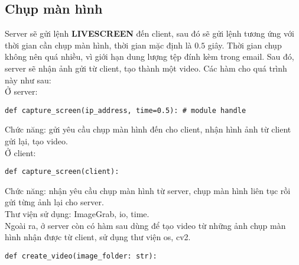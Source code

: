 \subsection{Chụp màn hình}
Server sẽ gửi lệnh \textbf{LIVESCREEN} đến client, sau đó sẽ gửi lệnh tương ứng với thời gian cần chụp màn hình, thời gian mặc định là $0.5$ giây. Thời gian chụp không nên quá nhiều, vì giới hạn dung lượng tệp đính kèm trong email. Sau đó, server sẽ nhận ảnh gửi từ client, tạo thành một video.
Các hàm cho quá trình này như sau:\\
Ở server:
\begin{lstlisting}
def capture_screen(ip_address, time=0.5): # module handle
\end{lstlisting}
Chức năng: gửi yêu cầu chụp màn hình đến cho client, nhận hình ảnh từ client gửi lại, tạo video.\\
Ở client:
\begin{lstlisting}
def capture_screen(client):
\end{lstlisting}
Chức năng: nhận yêu cầu chụp màn hình từ server, chụp màn hình liên tục rồi gửi từng ảnh lại cho server.\\
Thư viện sử dụng: ImageGrab, io, time.\\
Ngoài ra, ở server còn có hàm sau dùng để tạo video từ những ảnh chụp màn hình nhận được từ client, sử dụng thư viện os, cv2.
\begin{lstlisting}
def create_video(image_folder: str):
\end{lstlisting}
